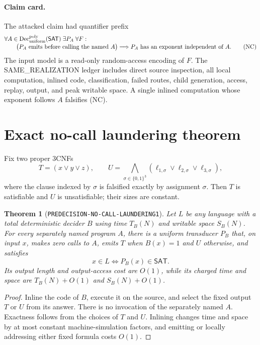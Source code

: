 \documentclass[11pt]{article}
\newtheorem{theorem}{Theorem}
\newcommand{\SAT}{\mathsf{SAT}}
\begin{document}
\paragraph{Claim card.}
The attacked claim had quantifier prefix
\begin{align}
 &\forall A\in\operatorname{Dec}_{\rm uniform}^{\rm poly}(\SAT)\;
 \exists P_A\;\forall F:\nonumber\\[-0.3em]
 &\qquad\bigl(P_A\text{ emits before calling the named }A\bigr)
 \Longrightarrow P_A\text{ has an exponent independent of }A.
 \tag{NC}
\end{align}
The input model is a read-only random-access encoding of $F$.  The
SAME\_REALIZATION ledger includes direct source inspection, all local
computation, inlined code, classification, failed routes, child generation,
access, replay, output, and peak writable space.  A single inlined computation
whose exponent follows $A$ falsifies (NC).

\section{Exact no-call laundering theorem}

Fix two proper $3$CNFs
\[
 T=(x\vee y\vee z),\qquad
 U=\bigwedge_{\sigma\in\{0,1\}^3}
   (\ell_{1,\sigma}\vee\ell_{2,\sigma}\vee\ell_{3,\sigma}),
\]
where the clause indexed by $\sigma$ is falsified exactly by assignment
$\sigma$.  Then $T$ is satisfiable and $U$ is unsatisfiable; their sizes are
constant.

\begin{theorem}[\texttt{PREDECISION-NO-CALL-LAUNDERING1}]
Let $L$ be any language with a total deterministic decider $B$ using time
$T_B(N)$ and writable space $S_B(N)$.  For every separately named program
$A$, there is a uniform transducer $P_B$ that, on input $x$, makes zero calls
to $A$, emits $T$ when $B(x)=1$ and $U$ otherwise, and satisfies
\[
 x\in L\iff P_B(x)\in\SAT.
\]
Its output length and output-access cost are $O(1)$, while its charged time
and space are $T_B(N)+O(1)$ and $S_B(N)+O(1)$.
\end{theorem}

\begin{proof}
Inline the code of $B$, execute it on the source, and select the fixed output
$T$ or $U$ from its answer.  There is no invocation of the separately named
$A$.  Exactness follows from the choices of $T$ and $U$.  Inlining changes
time and space by at most constant machine-simulation factors, and emitting or
locally addressing either fixed formula costs $O(1)$.
\end{proof}
\end{document}
